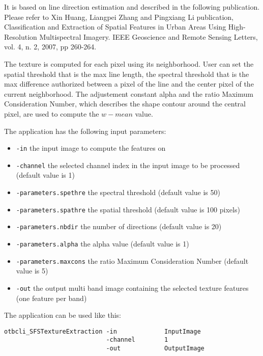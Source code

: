 It is based on line direction estimation and described in the following
publication. Please refer to Xin Huang, Liangpei Zhang and Pingxiang Li
publication, Classification and Extraction of Spatial Features in Urban Areas Using
High-Resolution Multispectral Imagery. IEEE Geoscience and Remote Sensing Letters,
vol. 4, n. 2, 2007, pp 260-264.

The texture is computed for each pixel using its neighborhood. User can set the
spatial threshold that is the max line length, the spectral threshold that is the
max difference authorized between a pixel of the line and the center pixel of the
current neighborhood. The adjustement constant alpha and the ratio Maximum
Consideration Number, which describes the shape contour around the central pixel,
are used to compute the $w - mean$ value.


The  application has the following input parameters:
\begin{itemize}
\item \verb?-in? the input image to compute the features on
\item \verb?-channel? the selected channel index in the input image to be processed (default value is 1)
\item \verb?-parameters.spethre? the spectral threshold (default value is 50) 
\item \verb?-parameters.spathre? the spatial threshold (default value is 100 pixels)
\item \verb?-parameters.nbdir? the number of directions (default value is 20)
\item \verb?-parameters.alpha? the alpha value (default value is 1)
\item \verb?-parameters.maxcons? the ratio Maximum Consideration Number (default value is 5)
\item \verb?-out? the output multi band image containing the selected texture features (one feature per band)
\end{itemize}
 

The application can be used like this:
\begin{verbatim}
otbcli_SFSTextureExtraction -in             InputImage
                            -channel        1
                            -out            OutputImage
\end{verbatim}
